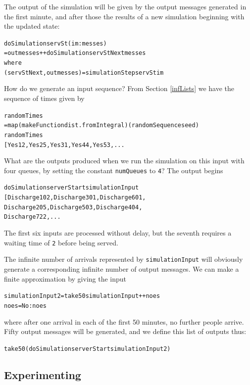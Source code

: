 The output of the simulation will be given by the output messages generated
in the first minute, and after those the results of a new simulation beginning
with the updated state:
\begin{alltt}
doSimulation servSt (im:messes)
  = outmesses ++ doSimulation servStNext messes
    where
    (servStNext , outmesses) = simulationStep servSt im
\end{alltt}
How do we generate an input sequence? From Section \ref{infLists} we have the 
sequence of times given by 
\begin{alltt}
randomTimes 
  = map (makeFunction dist . fromIntegral) (randomSequence seed)
  \step [2,5,1,4,3,1,2,5,...
\end{alltt}
We are to have arrivals of one person per minute, so the input messages we
generate are
\begin{alltt}
simulationInput 
  = zipWith Yes [1 ..\ ] randomTimes 
  \step [ Yes 1 2 , Yes 2 5 , Yes 3 1 , Yes 4 4 , Yes 5 3 ,...
\end{alltt}
What are the outputs produced when we run the simulation on this input with
four queues, by setting the constant \texttt{numQueues} to \texttt{4}? The output
begins
\begin{alltt}
doSimulation serverStart simulationInput
\step [Discharge 1 0 2, Discharge 3 0 1, Discharge 6 0 1, 
     Discharge 2 0 5, Discharge 5 0 3, Discharge 4 0 4,
     Discharge 7 2 2,...
\end{alltt}
The first six inputs are processed without delay, but the seventh requires a
waiting time of \texttt{2} before being served. 

The infinite number of arrivals
represented by \texttt{simulationInput} will obviously generate a corresponding
infinite number of output messages. We can make a finite approximation by
giving the input
\begin{alltt}
simulationInput2 = take 50 simulationInput ++ noes
noes = No : noes
\end{alltt}
where after one arrival in each of the first 50 minutes, no further
people arrive. Fifty output messages will be generated, and we define this
list of outputs thus:
\begin{alltt}
take 50 (doSimulation serverStart simulationInput2)
\end{alltt}

\subsection*{Experimenting}

